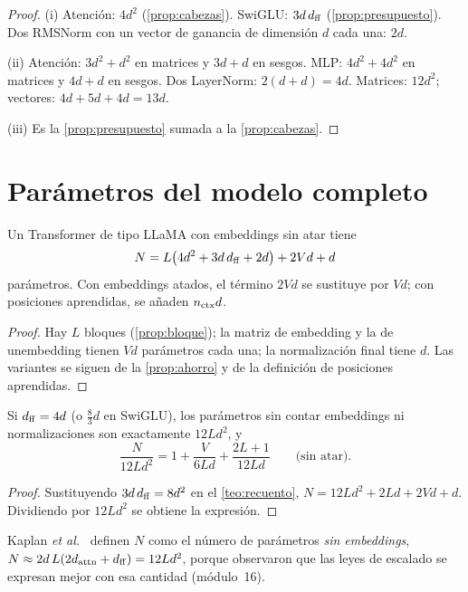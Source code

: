 \begin{proof}
(i) Atención: $4d^{2}$ (\cref{prop:cabezas}). SwiGLU: $3d\,d_{\mathrm{ff}}$ (\cref{prop:presupuesto}). Dos RMSNorm con un vector de ganancia de dimensión $d$ cada una: $2d$.

(ii) Atención: $3d^{2}+d^{2}$ en matrices y $3d+d$ en sesgos. MLP: $4d^{2}+4d^{2}$ en matrices y $4d+d$ en sesgos. Dos LayerNorm: $2(d+d)=4d$. Matrices: $12d^{2}$; vectores: $4d+5d+4d=13d$.

(iii) Es la \cref{prop:presupuesto} sumada a la \cref{prop:cabezas}.
\end{proof}

\section{Parámetros del modelo completo}

\begin{teorema}\label{teo:recuento}
Un Transformer de tipo LLaMA con embeddings sin atar tiene
\[
N=L\bigl(4d^{2}+3d\,d_{\mathrm{ff}}+2d\bigr)+2Vd+d
\]
parámetros. Con embeddings atados, el término $2Vd$ se sustituye por $Vd$; con posiciones aprendidas, se añaden $n_{\mathrm{ctx}} d$.
\end{teorema}

\begin{proof}
Hay $L$ bloques (\cref{prop:bloque}); la matriz de embedding y la de unembedding tienen $Vd$ parámetros cada una; la normalización final tiene $d$. Las variantes se siguen de la \cref{prop:ahorro} y de la definición de posiciones aprendidas.
\end{proof}

\begin{corolario}\label{cor:kaplan}
Si $d_{\mathrm{ff}}=4d$ (o $\frac83 d$ en SwiGLU), los parámetros sin contar embeddings ni normalizaciones son exactamente $12Ld^{2}$, y
\[
\frac{N}{12Ld^{2}}=1+\frac{V}{6Ld}+\frac{2L+1}{12Ld}\qquad\text{(sin atar)}.
\]
\end{corolario}

\begin{proof}
Sustituyendo $3d\,d_{\mathrm{ff}}=8d^{2}$ en el \cref{teo:recuento}, $N=12Ld^{2}+2Ld+2Vd+d$. Dividiendo por $12Ld^{2}$ se obtiene la expresión.
\end{proof}

Kaplan \emph{et al.}~\cite[§2.1, ecuación~(2.1) y tabla~1]{kaplan} definen $N$ como el número de parámetros \emph{sin embeddings}, $N\approx 2d\,L(2d_{\mathrm{attn}}+d_{\mathrm{ff}})=12Ld^{2}$, porque observaron que las leyes de escalado se expresan mejor con esa cantidad (módulo~16).

